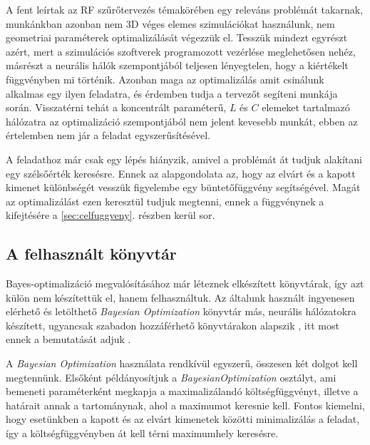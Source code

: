 		A fent leírtak az RF szűrőtervezés témakörében egy releváns problémát takarnak, munkánkban azonban nem 3D véges elemes szimulációkat használunk, nem geometriai paraméterek optimalizálását végezzük el. Tesszük mindezt egyrészt azért, mert a szimulációs szoftverek programozott vezérlése meglehetősen nehéz, másrészt a neurális hálók szempontjából teljesen lényegtelen, hogy a kiértékelt függvényben mi történik. Azonban maga az optimalizálás amit csinálunk alkalmas egy ilyen feladatra, és érdemben tudja a tervezőt segíteni munkája során. Visszatérni tehát a koncentrált paraméterű, $L$ és $C$ elemeket tartalmazó hálózatra az optimalizáció szempontjából nem jelent kevesebb munkát, ebben az értelemben nem jár a feladat egyszerűsítésével.
		
		A feladathoz már csak egy lépés hiányzik, amivel a problémát át tudjuk alakítani egy szélsőérték keresésre. Ennek az alapgondolata az, hogy az elvárt és a kapott kimenet különbségét vesszük figyelembe egy büntetőfüggvény segítségével. Magát az optimalizálást ezen keresztül tudjuk megtenni, ennek a függvénynek a kifejtésére a \ref{sec:celfuggveny}. részben kerül sor.
		
	\subsection{A felhasznált könyvtár}
	
		Bayes-optimalizáció megvalósításához már léteznek elkészített könyvtárak, így azt külön nem készítettük el, hanem felhasználtuk. Az általunk használt ingyenesen elérhető és letölthető \textit{Bayesian Optimization} könyvtár más, neurális hálózatokra készített, ugyancsak szabadon hozzáférhető könyvtárakon alapszik \cite{scipy}, itt most ennek a bemutatását adjuk \cite{lancpar_spar}.
		
		A \textit{Bayesian Optimization} használata rendkívül egyszerű, összesen két dolgot kell megtennünk. Elsőként példányosítjuk a \textit{BayesianOptimization} osztályt, ami bemeneti paraméterként megkapja a maximalizálandó költségfüggvényt, illetve a határait annak a tartománynak, ahol a maximumot keresnie kell. Fontos kiemelni, hogy esetünkben a kapott és az elvárt kimenetek közötti minimalizálás a feladat, így a költségfüggvényben át kell térni maximumhely keresésre. 
		
